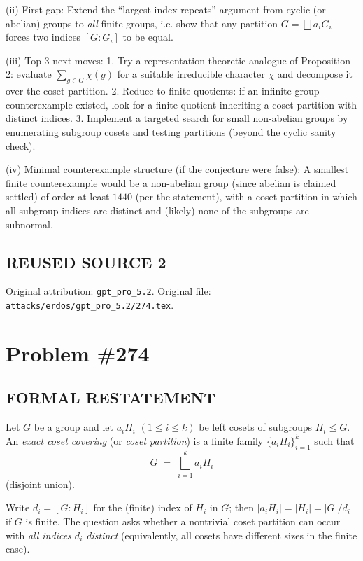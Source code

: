 (ii) First gap:
Extend the “largest index repeats” argument from cyclic (or abelian) groups to \emph{all} finite groups, i.e. show that any partition $G=\bigsqcup a_iG_i$ forces two indices $[G:G_i]$ to be equal.

(iii) Top 3 next moves:
1. Try a representation-theoretic analogue of Proposition 2: evaluate $\sum_{g\in G}\chi(g)$ for a suitable irreducible character $\chi$ and decompose it over the coset partition.
2. Reduce to finite quotients: if an infinite group counterexample existed, look for a finite quotient inheriting a coset partition with distinct indices.
3. Implement a targeted search for small non-abelian groups by enumerating subgroup cosets and testing partitions (beyond the cyclic sanity check).

(iv) Minimal counterexample structure (if the conjecture were false):
A smallest finite counterexample would be a non-abelian group (since abelian is claimed settled) of order at least $1440$ (per the statement), with a coset partition in which all subgroup indices are distinct and (likely) none of the subgroups are subnormal.



\subsection*{REUSED SOURCE 2}
Original attribution: \texttt{gpt\_pro\_5.2}.
Original file: \texttt{attacks/erdos/gpt\_pro\_5.2/274.tex}.

\section*{Problem \#274}

\subsection*{FORMAL RESTATEMENT}
Let $G$ be a group and let $a_iH_i$ $(1\le i\le k)$ be left cosets of subgroups $H_i\le G$.
An \emph{exact coset covering} (or \emph{coset partition}) is a finite family $\{a_iH_i\}_{i=1}^k$ such that
\[
G \;=\; \bigsqcup_{i=1}^k a_iH_i
\]
(disjoint union).

Write $d_i=[G:H_i]$ for the (finite) index of $H_i$ in $G$; then $|a_iH_i|=|H_i|=|G|/d_i$ if $G$ is finite.
The question asks whether a nontrivial coset partition can occur with \emph{all indices $d_i$ distinct} (equivalently, all cosets have different sizes in the finite case).

